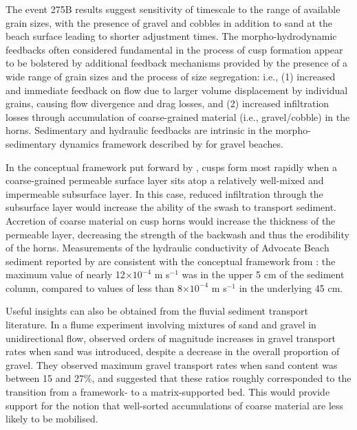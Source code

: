 The event 275B results suggest sensitivity of timescale to the range of available grain sizes, with the presence of gravel and cobbles in addition to sand at the beach surface leading to shorter adjustment times. The morpho-hydrodynamic feedbacks often considered fundamental in the process of cusp formation appear to be bolstered by additional feedback mechanisms provided by the presence of a wide range of grain sizes and the process of size segregation: i.e., (1) increased and immediate feedback on flow due to larger volume displacement by individual grains, causing flow divergence and drag losses, and (2) increased infiltration losses through accumulation of coarse-grained material (i.e., gravel/cobble) in the horns. Sedimentary and hydraulic feedbacks are intrinsic in the morpho-sedimentary dynamics framework described by \citet{Buscombe_Masselink2006} for gravel beaches.

In the conceptual framework put forward by \citet{LonguetHiggins_Parkin1962}, cusps form most rapidly when a coarse-grained permeable surface layer sits atop a relatively well-mixed and impermeable subsurface layer. In this case, reduced infiltration through the subsurface layer would increase the ability of the swash to transport sediment. Accretion of coarse material on cusp horns would increase the thickness of the permeable layer, decreasing the strength of the backwash and thus the erodibility of the horns. Measurements of the hydraulic conductivity of Advocate Beach sediment reported by \citet{Guest_Hay2017} are consistent with the conceptual framework from \citet{LonguetHiggins_Parkin1962}: the maximum value of nearly 12$\times 10^{-4}$ m s$^{-1}$ was in the upper 5 cm of the sediment column, compared to values of less than 8$\times 10^{-4}$ m s$^{-1}$ in the underlying 45 cm.

Useful insights can also be obtained from the fluvial sediment transport literature. In a flume experiment involving mixtures of sand and gravel in unidirectional flow, \citet{Wilcock_etal2001} observed orders of magnitude increases in gravel transport rates when sand was introduced, despite a decrease in the overall proportion of gravel. They observed maximum gravel transport rates when sand content was between 15 and 27\%, and suggested that these ratios roughly corresponded to the transition from a framework- to a matrix-supported bed. This would provide support for the notion that well-sorted accumulations of coarse material are less likely to be mobilised.

